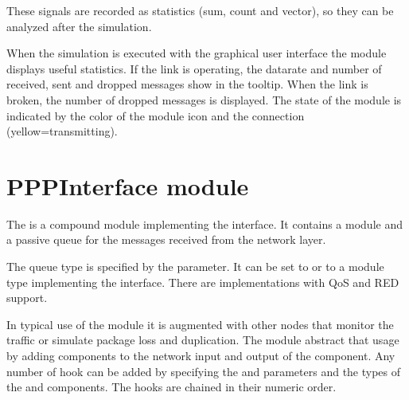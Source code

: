 These signals are recorded as statistics (sum, count and vector), so
they can be analyzed after the simulation.

When the simulation is executed with the graphical user interface
the module displays useful statistics. If the link is operating,
the datarate and number of received, sent and dropped messages
show in the tooltip. When the link is broken, the number of dropped
messages is displayed. The state of the module is indicated by the color
of the module icon and the connection (yellow=transmitting).

\section{PPPInterface module}

The  is a compound module implementing the 
interface. It contains a  module and a passive queue for the messages
received from the network layer.

The queue type is specified by the  parameter.
It can be set to  or to a module type implementing
the  interface. There are implementations
with QoS and RED support.

In typical use of the  module it is augmented with other nodes
that monitor the traffic or simulate package loss and duplication.
The  module abstract that usage by adding
 components to the network input and output of the
 component. Any number of hook can be added by
specifying the  and 
parameters and the types of the  and 
components. The hooks are chained in their numeric order.




